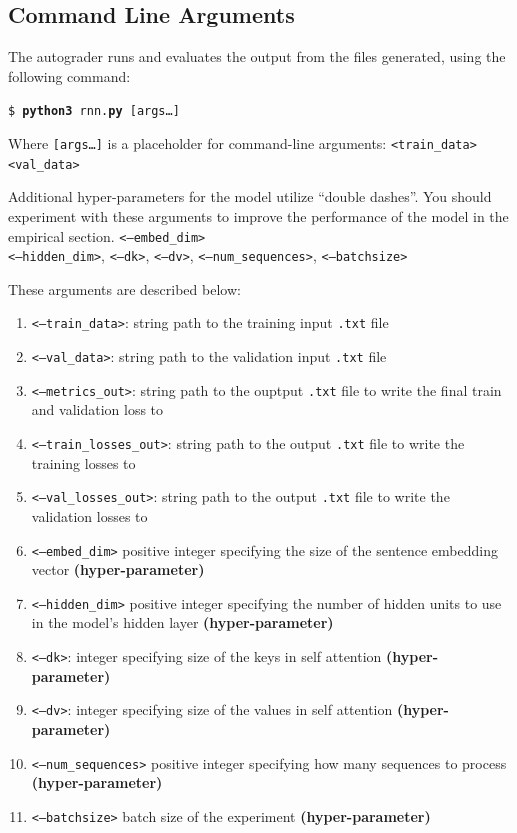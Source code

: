 \documentclass[11pt,addpoints,answers]{exam}
\begin{document}
\subsection{Command Line Arguments}\label{command}
The autograder runs and evaluates the output from the files generated, using the following command:

\begin{tabbing}
\=\texttt{\$ \textbf{python3} rnn.\textbf{py} [args\dots]}\\
\end{tabbing}
    
Where \texttt{[args\dots]} is a placeholder for command-line arguments: \texttt{<train\_data>} \texttt{<val\_data>}

Additional hyper-parameters for the model utilize ``double dashes''. You should experiment with these arguments to improve the performance of the model in the empirical section. \texttt{<--embed\_dim>} \\ \texttt{<--hidden\_dim>}, \texttt{<--dk>}, \texttt{<--dv>}, \texttt{<--num\_sequences>}, \texttt{<--batch\textunderscore size>}

These arguments are described below:
\begin{enumerate}
    \item \texttt{<--train\_data>}: string path to the training input \texttt{.txt} file 
    \item \texttt{<--val\_data>}: string path to the validation input \texttt{.txt} file 
    \item \texttt{<--metrics\_out>}: string path to the ouptput \texttt{.txt} file to write the final train and validation loss to
    \item \texttt{<--train\_losses\_out>}: string path to the output \texttt{.txt} file to write the training losses to
    \item \texttt{<--val\_losses\_out>}: string path to the output \texttt{.txt} file to write the validation losses to
     \item \texttt{<--embed\_dim>} positive integer specifying the size of the sentence embedding vector \textbf{(hyper-parameter)}
    \item \texttt{<--hidden\_dim>} positive integer specifying the number of hidden units to use in the model's hidden layer \textbf{(hyper-parameter)}
    \item \texttt{<--dk>}: integer specifying size of the keys in self attention \textbf{(hyper-parameter)}
    \item \texttt{<--dv>}: integer specifying size of the values in self attention \textbf{(hyper-parameter)}
    \item \texttt{<--num\_sequences>} positive integer specifying how many sequences to process \textbf{(hyper-parameter)}
    \item \texttt{<--batch\textunderscore size>} batch size of the experiment \textbf{(hyper-parameter)}
\end{enumerate}
\end{document}
